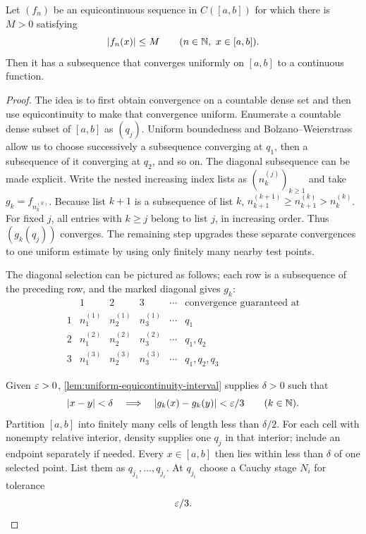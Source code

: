 \begin{theorem}
\label{thm:arzela-ascoli-interval}
Let $(f_n)$ be an equicontinuous sequence in $C([a,b])$ for which there is
$M>0$ satisfying
\[
\lvert f_n(x)\rvert\leq M
\qquad(n\in\mathbb{N},\ x\in[a,b]).
\]
Then it has a subsequence that converges uniformly on $[a,b]$ to a
continuous function.
\end{theorem}
\begin{proof}
The idea is to first obtain convergence on a countable dense set and then
use equicontinuity to make that convergence uniform.  Enumerate a countable
dense subset of $[a,b]$ as $(q_j)$.  Uniform boundedness and
Bolzano--Weierstrass allow us to choose successively a subsequence converging
at $q_1$, then a subsequence of it converging at $q_2$, and so on.  The
diagonal subsequence can be made explicit. Write the nested increasing
index lists as $(n^{(j)}_k)_{k\geq1}$ and take $g_k=f_{n^{(k)}_k}$.
Because list $k+1$ is a subsequence of list $k$,
$n^{(k+1)}_{k+1}\geq n^{(k)}_{k+1}>n^{(k)}_k$. For fixed $j$, all entries
with $k\geq j$ belong to list $j$, in increasing order. Thus $(g_k(q_j))$
converges. The remaining step upgrades these separate convergences to one
uniform estimate by using only finitely many nearby test points.

The diagonal selection can be pictured as follows; each row is a
subsequence of the preceding row, and the marked diagonal gives $g_k$:
\[
\begin{array}{c|cccc|l}
&1&2&3&\cdots&\text{convergence guaranteed at}\\\hline
1&\boxed{n^{(1)}_1}&n^{(1)}_2&n^{(1)}_3&\cdots&q_1\\
2&n^{(2)}_1&\boxed{n^{(2)}_2}&n^{(2)}_3&\cdots&q_1,q_2\\
3&n^{(3)}_1&n^{(3)}_2&\boxed{n^{(3)}_3}&\cdots&q_1,q_2,q_3
\end{array}
\]

Given $\varepsilon>0$, \cref{lem:uniform-equicontinuity-interval} supplies
$\delta>0$ such that
\[
\lvert x-y\rvert<\delta
\quad\Longrightarrow\quad
\lvert g_k(x)-g_k(y)\rvert<\varepsilon/3
\qquad(k\in\mathbb{N}).
\]
Partition $[a,b]$ into finitely many cells of length less than $\delta/2$.
For each cell with nonempty relative interior, density supplies one $q_j$
in that interior; include an endpoint separately if needed. Every
$x\in[a,b]$ then lies within less than $\delta$ of one selected point.
List them as $q_{j_1},\ldots,q_{j_\ell}$.
At $q_{j_i}$ choose a Cauchy stage $N_i$ for tolerance
\[
\varepsilon/3.
\]


\end{proof}

